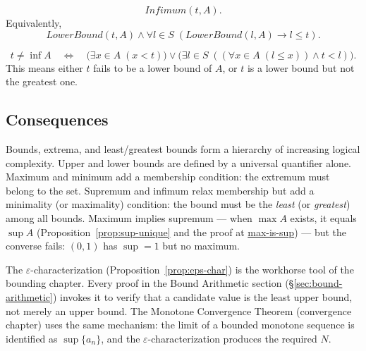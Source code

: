 \begin{remark*}
\[
Infimum(t,A).
\]
Equivalently,
\[
LowerBound(t,A)
\land
\forall l \in S \; (LowerBound(l,A) \rightarrow l \le t).
\]
\end{remark*}

\begin{remark*}
\[
t \neq \inf A
\quad\Longleftrightarrow\quad
\bigl(\exists x \in A \; (x < t)\bigr)
\lor
\bigl(\exists l \in S \; ((\forall x \in A \; (l \le x)) \land t < l)\bigr).
\]
This means either $t$ fails to be a lower bound of $A$, or $t$ is a lower bound but not the
greatest one.
\end{remark*}










\subsection{Consequences}

\begin{remark*}
Bounds, extrema, and least/greatest bounds form a hierarchy of increasing
logical complexity.
Upper and lower bounds are defined by a universal quantifier alone.
Maximum and minimum add a membership condition: the extremum must belong
to the set.
Supremum and infimum relax membership but add a minimality (or maximality)
condition: the bound must be the \emph{least} (or \emph{greatest}) among
all bounds.
Maximum implies supremum --- when $\max A$ exists, it equals $\sup A$
(Proposition~\ref{prop:sup-unique} and the proof at
\hyperref[prf:max-is-sup]{max-is-sup}) --- but the converse fails:
$(0,1)$ has $\sup = 1$ but no maximum.
\end{remark*}

\begin{remark*}
The $\varepsilon$-characterization (Proposition~\ref{prop:eps-char}) is the
workhorse tool of the bounding chapter.
Every proof in the Bound Arithmetic section
(\S\ref{sec:bound-arithmetic}) invokes it to verify that a candidate value
is the least upper bound, not merely an upper bound.
The Monotone Convergence Theorem (convergence chapter) uses the same
mechanism: the limit of a bounded monotone sequence is identified as
$\sup\{a_n\}$, and the $\varepsilon$-characterization produces the required
$N$.
\end{remark*}



